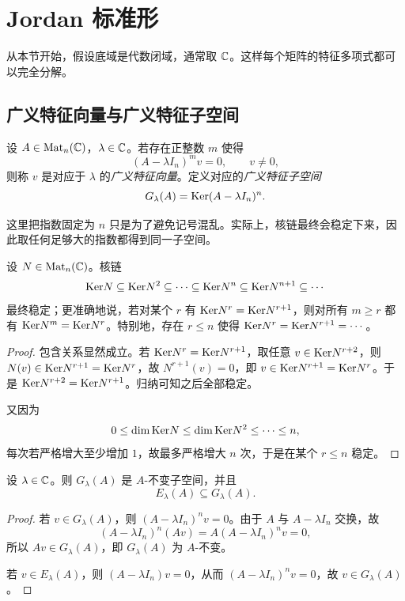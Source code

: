 \section{Jordan 标准形}\label{sec:jordan-form}

从本节开始，假设底域是代数闭域，通常取 \(\mathbb{C}\)。这样每个矩阵的特征多项式都可以完全分解。

\subsection{广义特征向量与广义特征子空间}

\begin{definition}
设 \(A\in \mathrm{Mat}_n(\mathbb{C})\)，\(\lambda\in \mathbb{C}\)。若存在正整数 \(m\) 使得
\[
(A-\lambda I_n)^m v=0,
\qquad v\neq 0,
\]
则称 \(v\) 是对应于 \(\lambda\) 的\emph{广义特征向量}。定义对应的\emph{广义特征子空间}
\[
G_\lambda(A)=\mathrm{Ker}(A-\lambda I_n)^n.
\]
\end{definition}

这里把指数固定为 \(n\) 只是为了避免记号混乱。实际上，核链最终会稳定下来，因此取任何足够大的指数都得到同一子空间。

\begin{lemma}\label{lem:kernel-stabilize}
设 \(N\in \mathrm{Mat}_n(\mathbb{C})\)。核链
\[
\mathrm{Ker} N\subseteq \mathrm{Ker} N^2\subseteq \cdots\subseteq \mathrm{Ker} N^n\subseteq \mathrm{Ker} N^{n+1}\subseteq \cdots
\]
最终稳定；更准确地说，若对某个 \(r\) 有 \(\mathrm{Ker} N^r=\mathrm{Ker} N^{r+1}\)，则对所有 \(m\ge r\) 都有 \(\mathrm{Ker} N^m=\mathrm{Ker} N^r\)。特别地，存在 \(r\le n\) 使得 \(\mathrm{Ker} N^r=\mathrm{Ker} N^{r+1}=\cdots\)。
\end{lemma}

\begin{proof}
包含关系显然成立。若 \(\mathrm{Ker} N^r=\mathrm{Ker} N^{r+1}\)，取任意 \(v\in \mathrm{Ker} N^{r+2}\)，则 \(N(v)\in \mathrm{Ker} N^{r+1}=\mathrm{Ker} N^r\)，故 \(N^{r+1}(v)=0\)，即 \(v\in \mathrm{Ker} N^{r+1}=\mathrm{Ker} N^r\)。于是 \(\mathrm{Ker} N^{r+2}=\mathrm{Ker} N^{r+1}\)。归纳可知之后全部稳定。

又因为
\[
0\le \dim\mathrm{Ker} N\le \dim\mathrm{Ker} N^2\le \cdots\le n,
\]
每次若严格增大至少增加 \(1\)，故最多严格增大 \(n\) 次，于是在某个 \(r\le n\) 稳定。
\end{proof}

\begin{proposition}
设 \(\lambda\in \mathbb{C}\)。则 \(G_\lambda(A)\) 是 \(A\)-不变子空间，并且
\[
E_\lambda(A)\subseteq G_\lambda(A).
\]
\end{proposition}

\begin{proof}
若 \(v\in G_\lambda(A)\)，则 \((A-\lambda I_n)^n v=0\)。由于 \(A\) 与 \(A-\lambda I_n\) 交换，故
\[
(A-\lambda I_n)^n(Av)=A(A-\lambda I_n)^n v=0,
\]
所以 \(Av\in G_\lambda(A)\)，即 \(G_\lambda(A)\) 为 \(A\)-不变。

若 \(v\in E_\lambda(A)\)，则 \((A-\lambda I_n)v=0\)，从而 \((A-\lambda I_n)^n v=0\)，故 \(v\in G_\lambda(A)\)。
\end{proof}

